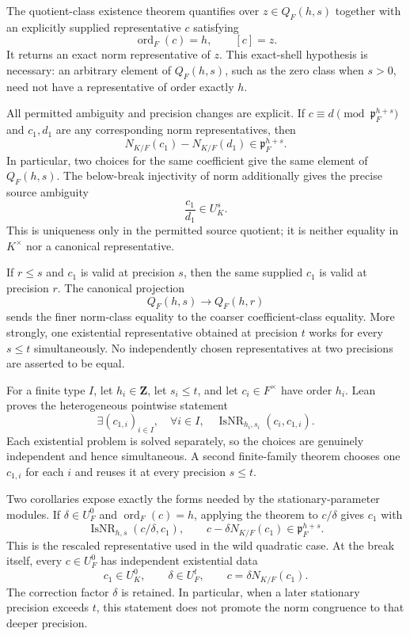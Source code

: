 \begin{lemma}
The quotient-class existence theorem quantifies over
$z\in Q_F(h,s)$ together with an explicitly supplied representative
$c$ satisfying
\[
 \operatorname{ord}_F(c)=h,
 \qquad [c]=z.
\]
It returns an exact norm representative of $z$.  This exact-shell
hypothesis is necessary: an arbitrary element of $Q_F(h,s)$, such as the
zero class when $s>0$, need not have a representative of order exactly
$h$.

All permitted ambiguity and precision changes are explicit.  If
$c\equiv d\pmod{\mathfrak p_F^{h+s}}$ and $c_1,d_1$ are any corresponding
norm representatives, then
\[
 N_{K/F}(c_1)-N_{K/F}(d_1)\in\mathfrak p_F^{h+s}.
\]
In particular, two choices for the same coefficient give the same element
of $Q_F(h,s)$.  The below-break injectivity of norm additionally gives the
precise source ambiguity
\[
 \frac{c_1}{d_1}\in U_K^s.
\]
This is uniqueness only in the permitted source quotient; it is neither
equality in $K^\times$ nor a canonical representative.

If $r\le s$ and $c_1$ is valid at precision $s$, then the same supplied
$c_1$ is valid at precision $r$.  The canonical projection
\[
 Q_F(h,s)\longrightarrow Q_F(h,r)
\]
sends the finer norm-class equality to the coarser coefficient-class
equality.  More strongly, one existential representative obtained at
precision $t$ works for every $s\le t$ simultaneously.  No independently
chosen representatives at two precisions are asserted to be equal.

For a finite type $I$, let $h_i\in\mathbf Z$, let $s_i\le t$, and let
$c_i\in F^\times$ have order $h_i$.  Lean proves the heterogeneous
pointwise statement
\[
 \exists (c_{1,i})_{i\in I},\quad
 \forall i\in I,\quad
 \operatorname{IsNR}_{h_i,s_i}(c_i,c_{1,i}).
\]
Each existential problem is solved separately, so the choices are genuinely
independent and hence simultaneous.  A second finite-family theorem chooses
one $c_{1,i}$ for each $i$ and reuses it at every precision $s\le t$.

Two corollaries expose exactly the forms needed by the stationary-parameter
modules.  If $\delta\in U_F^0$ and
$\operatorname{ord}_F(c)=h$, applying the theorem to $c/\delta$ gives
$c_1$ with
\[
 \operatorname{IsNR}_{h,s}(c/\delta,c_1),
 \qquad
 c-\delta N_{K/F}(c_1)\in\mathfrak p_F^{h+s}.
\]
This is the rescaled representative used in the wild quadratic case.  At
the break itself, every $c\in U_F^0$ has independent existential data
\[
 c_1\in U_K^0,\qquad \delta\in U_F^t,\qquad
 c=\delta N_{K/F}(c_1).
\]
The correction factor $\delta$ is retained.  In particular, when a later
stationary precision exceeds $t$, this statement does not promote the norm
congruence to that deeper precision.


\end{lemma}

